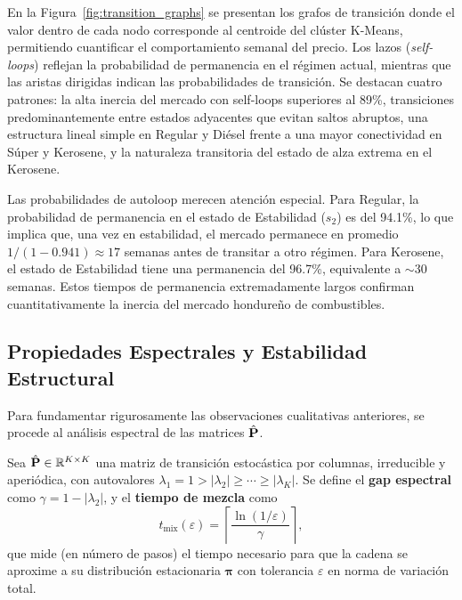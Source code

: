 En la Figura~\ref{fig:transition_graphs} se presentan los grafos de transición donde 
el valor dentro de cada nodo corresponde al centroide del clúster K-Means, permitiendo 
cuantificar el comportamiento semanal del precio. Los lazos (\textit{self-loops}) 
reflejan la probabilidad de permanencia en el régimen actual, mientras que las aristas 
dirigidas indican las probabilidades de transición. Se destacan cuatro patrones: 
la alta inercia del mercado con self-loops superiores al 89\%, transiciones 
predominantemente entre estados adyacentes que evitan saltos abruptos, una estructura 
lineal simple en Regular y Diésel frente a una mayor conectividad en Súper y Kerosene, 
y la naturaleza transitoria del estado de alza extrema en el Kerosene.

Las probabilidades de autoloop merecen atención especial.  Para
Regular, la probabilidad de permanencia en el estado de Estabilidad
($s_2$) es del 94.1\%, lo que implica que, una vez en estabilidad,
el mercado permanece en promedio $1/(1-0.941) \approx 17$ semanas
antes de transitar a otro régimen.  Para Kerosene, el estado de
Estabilidad tiene una permanencia del 96.7\%, equivalente a $\sim 30$
semanas.  Estos tiempos de permanencia extremadamente largos confirman
cuantitativamente la inercia del mercado hondureño de
combustibles.

\subsection{Propiedades Espectrales y Estabilidad Estructural}
\label{subsec:propiedades_espectrales}

Para fundamentar rigurosamente las observaciones cualitativas
anteriores, se procede al análisis espectral de las matrices
$\hat{\mathbf{P}}$.

\begin{definition}
\label{def:gap_espectral}
Sea $\hat{\mathbf{P}} \in \mathbb{R}^{K \times K}$ una matriz de
transición estocástica por columnas, irreducible y aperiódica, con
autovalores $\lambda_1 = 1 > |\lambda_2| \ge \cdots \ge |\lambda_K|$.
Se define el \textbf{gap espectral} como $\gamma = 1 - |\lambda_2|$,
y el \textbf{tiempo de mezcla} como
\begin{equation}
    t_{\text{mix}}(\varepsilon) = \left\lceil
    \frac{\ln(1/\varepsilon)}{\gamma} \right\rceil,
    \label{eq:mixing_time}
\end{equation}
que mide (en número de pasos) el tiempo necesario para que la cadena
se aproxime a su distribución estacionaria $\boldsymbol{\pi}$ con
tolerancia $\varepsilon$ en norma de variación total.
\end{definition}

